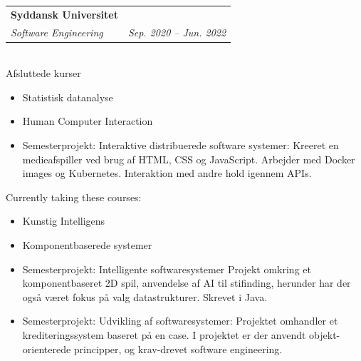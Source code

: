 \documentclass[11pt]{article}
\makeatletter
\newcommand{\resumeSubheading}[4]{
  \noindent\begin{tabular*}{0.98\textwidth}[t]{l@{\extracolsep{\fill}}r}
    \noindent \textbf{#1} & #2 \\ \vspace{-3pt} 
    \noindent \textit{\small#3} & \textit{\small #4} 
  \end{tabular*}\vspace{7pt}
}
\makeatother
\begin{document}
\resumeSubheading{Syddansk Universitet}{}{Software Engineering}{Sep.
2020 -- Jun. 2022}\\\vspace{0.25cm}
{\indent\small Afsluttede kurser}
  \vspace{-0.3cm}
  {\small 
  \begin{itemize}
  \setlength{\itemsep}{-1pt}
    \item Statistisk datanalyse
    \item Human Computer Interaction
    \item Semesterprojekt: Interaktive distribuerede software systemer:
      \subitem Kreeret en medieafspiller ved brug af HTML, CSS og JavaScript.
      Arbejder med Docker images og Kubernetes. Interaktion med andre hold
      igennem APIs.
\end{itemize}} 
{\indent\small Currently taking these courses:}
  {\small 
  \begin{itemize}
  \setlength{\itemsep}{-1pt}
    \item Kunstig Intelligens
    \item Komponentbaserede systemer
    \item Semesterprojekt: Intelligente softwaresystemer
      \subitem Projekt omkring et komponentbaseret 2D spil, anvendelse af AI til
      stifinding, herunder har der også været fokus på valg datastrukturer.
      Skrevet i Java.
    \item Semesterprojekt: Udvikling af softwaresystemer:
      \subitem Projektet omhandler et krediteringssystem baseret på en case. I
      projektet er der anvendt objekt-orienterede principper, og krav-drevet
      software engineering.
  \end{itemize}} 


\vspace{0.3cm}
\end{document}
